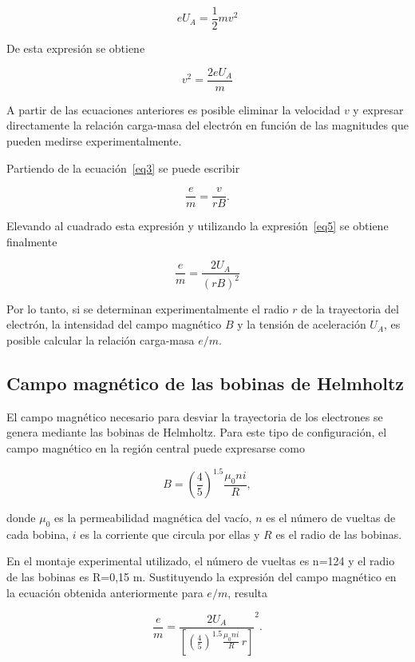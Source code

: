 \documentclass{article}
\begin{document}
\begin{equation}
    eU_A = \frac{1}{2}mv^2
    \label{eq4}
\end{equation}

De esta expresión se obtiene

\begin{equation}
    v^2 = \frac{2eU_A}{m}    
    \label{eq5}
\end{equation}

A partir de las ecuaciones anteriores es posible eliminar la velocidad \(v\) y expresar directamente la relación carga-masa del electrón en función de las magnitudes que pueden medirse experimentalmente.

Partiendo de la ecuación~\ref{eq3} se puede escribir

\[
\frac{e}{m} = \frac{v}{rB}.
\]

Elevando al cuadrado esta expresión y utilizando la expresión~\ref{eq5} se obtiene finalmente

\begin{equation}
    \frac{e}{m} = \frac{2U_A}{{(rB)}^2}    
    \label{eq6}
\end{equation}


Por lo tanto, si se determinan experimentalmente el radio \(r\) de la trayectoria del electrón, la intensidad del campo magnético \(B\) y la tensión de aceleración \(U_A\), es posible calcular la relación carga-masa \(e/m\).

\subsection{Campo magnético de las bobinas de Helmholtz}

El campo magnético necesario para desviar la trayectoria de los electrones se genera mediante las bobinas de Helmholtz. Para este tipo de configuración, el campo magnético en la región central puede expresarse como

\[
B =
{\left(\frac{4}{5}\right)}^{1.5}
\frac{\mu_0 n i}{R},
\]

donde \(\mu_0\) es la permeabilidad magnética del vacío, \(n\) es el número de vueltas de cada bobina, \(i\) es la corriente que circula por ellas y \(R\) es el radio de las bobinas.

En el montaje experimental utilizado, el número de vueltas es n=124 y el radio de las bobinas es R=0,15 m. Sustituyendo la expresión del campo magnético en la ecuación obtenida anteriormente para \(e/m\), resulta

\[
\frac{e}{m}
=
\frac{2U_A}
{\left[
{\left(\frac{4}{5}\right)}^{1.5}
\frac{\mu_0ni}{R}
\,r
\right]}^{2}.
\]
\end{document}
